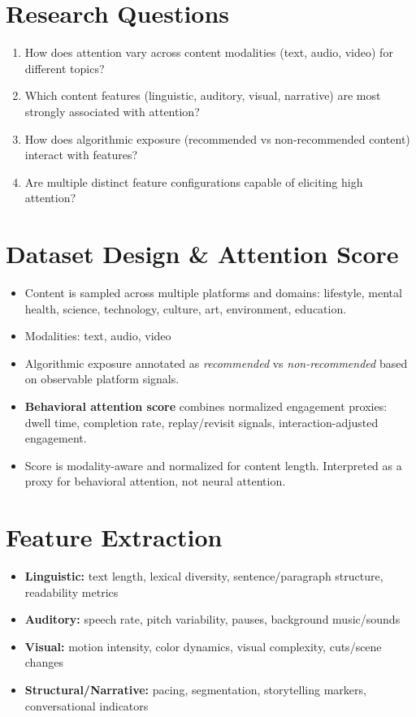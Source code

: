 \documentclass[11pt,a4paper]{article}
\begin{document}
\section*{Research Questions}
\begin{enumerate}[leftmargin=*]
    \item How does attention vary across content modalities (text, audio, video) for different topics?
    \item Which content features (linguistic, auditory, visual, narrative) are most strongly associated with attention?
    \item How does algorithmic exposure (recommended vs non-recommended content) interact with features?
    \item Are multiple distinct feature configurations capable of eliciting high attention?
\end{enumerate}

\section*{Dataset Design \& Attention Score}
\begin{itemize}[leftmargin=*]
    \item Content is sampled across multiple platforms and domains: lifestyle, mental health, science, technology, culture, art, environment, education.
    \item Modalities: text, audio, video
    \item Algorithmic exposure annotated as \textit{recommended} vs \textit{non-recommended} based on observable platform signals.
    \item \textbf{Behavioral attention score} combines normalized engagement proxies: dwell time, completion rate, replay/revisit signals, interaction-adjusted engagement.
    \item Score is modality-aware and normalized for content length. Interpreted as a proxy for behavioral attention, not neural attention.
\end{itemize}

\section*{Feature Extraction}
\begin{itemize}[leftmargin=*]
    \item \textbf{Linguistic:} text length, lexical diversity, sentence/paragraph structure, readability metrics
    \item \textbf{Auditory:} speech rate, pitch variability, pauses, background music/sounds
    \item \textbf{Visual:} motion intensity, color dynamics, visual complexity, cuts/scene changes
    \item \textbf{Structural/Narrative:} pacing, segmentation, storytelling markers, conversational indicators
\end{itemize}
\end{document}
